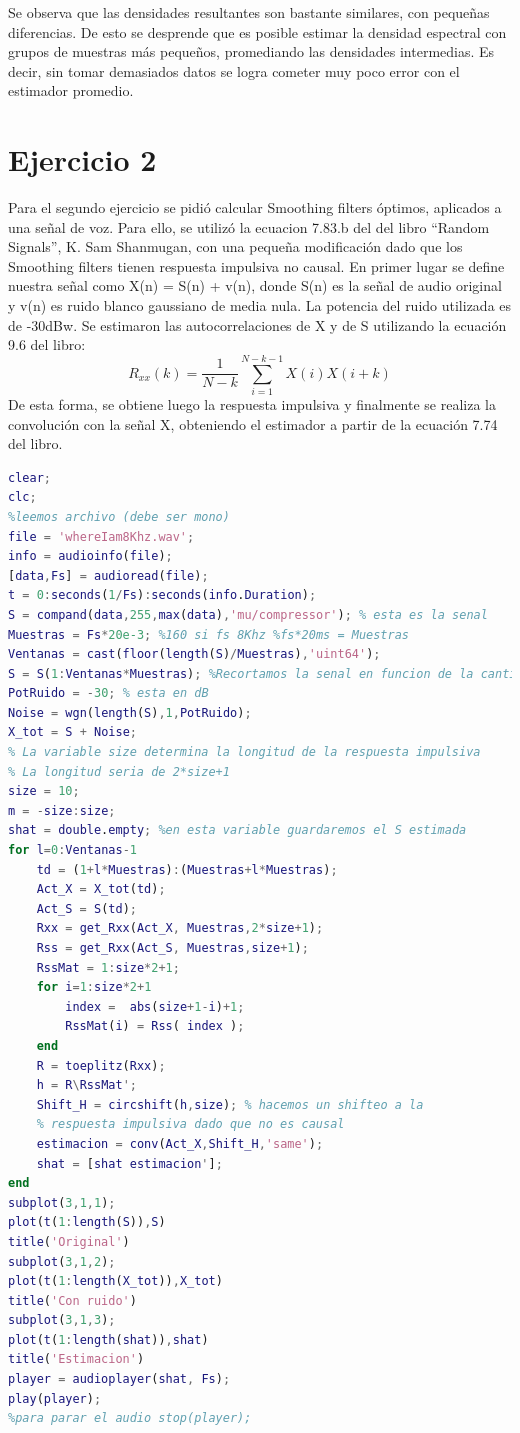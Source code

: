 Se observa que las densidades resultantes son bastante similares, con pequeñas diferencias. De esto se desprende que es posible estimar la densidad espectral con grupos de muestras más pequeños, promediando las densidades intermedias. Es decir, sin tomar demasiados datos se logra cometer muy poco error con el estimador promedio.

\newpage
\section*{Ejercicio 2}
Para el segundo ejercicio se pidió calcular Smoothing filters óptimos, aplicados a una señal de voz.
Para ello, se utilizó la ecuacion 7.83.b del del libro ``Random Signals'', K. Sam Shanmugan, con una pequeña modificación dado que los Smoothing filters tienen respuesta impulsiva no causal.
En primer lugar se define nuestra señal como X(n) = S(n) + v(n), donde S(n) es la señal de audio original y v(n) es ruido blanco gaussiano de media nula. La potencia del ruido utilizada es de -30dBw. Se estimaron las autocorrelaciones de X y de S utilizando la ecuación 9.6 del libro:
$$R_{xx}(k) = \frac{1}{N - k} \sum_{i=1}^{N-k-1}X(i)X(i+k)$$
De esta forma, se obtiene luego la respuesta impulsiva y finalmente se realiza la convolución con la señal X, obteniendo el estimador a partir de la ecuación 7.74 del libro.

\begin{lstlisting}[language=Matlab, caption=Ejercicio2.m]
clear;
clc;
%leemos archivo (debe ser mono)
file = 'whereIam8Khz.wav';
info = audioinfo(file);
[data,Fs] = audioread(file);
t = 0:seconds(1/Fs):seconds(info.Duration);
S = compand(data,255,max(data),'mu/compressor'); % esta es la senal
Muestras = Fs*20e-3; %160 si fs 8Khz %fs*20ms = Muestras
Ventanas = cast(floor(length(S)/Muestras),'uint64'); 
S = S(1:Ventanas*Muestras); %Recortamos la senal en funcion de la cantidad de ventanas
PotRuido = -30; % esta en dB
Noise = wgn(length(S),1,PotRuido);
X_tot = S + Noise;
% La variable size determina la longitud de la respuesta impulsiva
% La longitud seria de 2*size+1
size = 10;
m = -size:size;
shat = double.empty; %en esta variable guardaremos el S estimada
for l=0:Ventanas-1
    td = (1+l*Muestras):(Muestras+l*Muestras);
    Act_X = X_tot(td);    
    Act_S = S(td);
    Rxx = get_Rxx(Act_X, Muestras,2*size+1);
    Rss = get_Rxx(Act_S, Muestras,size+1);
    RssMat = 1:size*2+1;
    for i=1:size*2+1
        index =  abs(size+1-i)+1;
        RssMat(i) = Rss( index );
    end
    R = toeplitz(Rxx);
    h = R\RssMat';
    Shift_H = circshift(h,size); % hacemos un shifteo a la 
    % respuesta impulsiva dado que no es causal
    estimacion = conv(Act_X,Shift_H,'same');        
    shat = [shat estimacion'];
end
subplot(3,1,1);
plot(t(1:length(S)),S)
title('Original')
subplot(3,1,2);
plot(t(1:length(X_tot)),X_tot)
title('Con ruido')
subplot(3,1,3);
plot(t(1:length(shat)),shat)
title('Estimacion')
player = audioplayer(shat, Fs);
play(player);
%para parar el audio stop(player);
\end{lstlisting}

